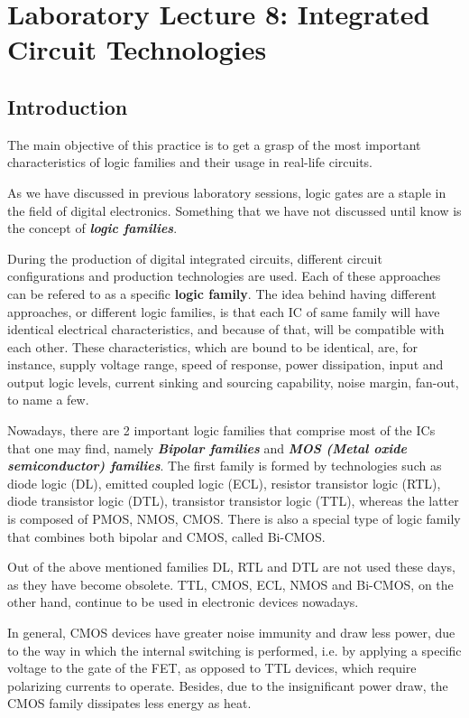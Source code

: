 \section{Laboratory Lecture 8: Integrated Circuit Technologies}

\subsection{Introduction}

The main objective of this practice is to get a grasp of the most important characteristics of logic families and their usage in real-life circuits.\medskip

As we have discussed in previous laboratory sessions, logic gates are a staple in the field of digital electronics. Something that we have not discussed until know is the concept of \textbf{\textit{logic families}}. \medskip

During the production of digital integrated circuits, different circuit configurations and production technologies are used. Each of these approaches can be refered to as a specific \textbf{logic family}. The idea behind having different approaches, or different logic families, is that each IC of same family will have identical electrical characteristics, and because of that, will be compatible with each other. These characteristics, which are bound to be identical, are, for instance, supply voltage range, speed of response, power dissipation, input and output logic levels, current sinking and sourcing capability, noise margin, fan-out, to name a few.\medskip

Nowadays, there are 2 important logic families that comprise most of the ICs that one may find, namely \textbf{\textit{Bipolar families}} and \textbf{\textit{MOS (Metal oxide semiconductor) families}}. The first family is formed by technologies such as diode logic (DL), emitted coupled logic (ECL), resistor transistor logic (RTL), diode transistor logic (DTL), transistor transistor logic (TTL), whereas the latter is composed of PMOS, NMOS, CMOS. There is also a special type of logic family that combines both bipolar and CMOS, called Bi-CMOS. \medskip

Out of the above mentioned families DL, RTL and DTL are not used these days, as they have become obsolete. TTL, CMOS, ECL, NMOS and Bi-CMOS, on the other hand, continue to be used in electronic devices nowadays.\medskip

In general, CMOS devices have greater noise immunity and draw less power, due to the way in which the internal switching is performed, i.e. by applying a specific voltage to the gate of the FET, as opposed to TTL devices, which require polarizing currents to operate. Besides, due to the insignificant power draw, the CMOS family dissipates less energy as heat. \medskip

